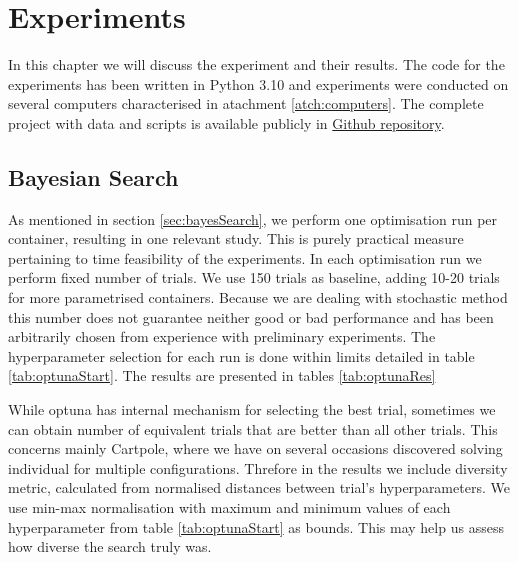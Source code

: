 \chapter{Experiments}
\label{ch:experiments}
In this chapter we will discuss the experiment and their results. The code for the experiments has been written in Python 3.10 and experiments were conducted on several computers characterised in atachment \ref{atch:computers}. The complete project with data and scripts is available publicly in \href{https://github.com/Schkliba/MastersThesis}{Github repository}.

\section{Bayesian Search}
As mentioned in section \ref{sec:bayesSearch}, we perform one optimisation run per container, resulting in one relevant study. This is purely practical measure pertaining to time feasibility of the experiments. In each optimisation run we perform fixed number of trials. We use 150 trials as baseline, adding 10-20 trials for more parametrised containers. Because we are dealing with stochastic method this number does not guarantee neither good or bad performance and has been arbitrarily chosen from experience with preliminary experiments.
The hyperparameter selection for each run is done within limits detailed in table \ref{tab:optunaStart}. The results are presented in tables \ref{tab:optunaRes}

While optuna has internal mechanism for selecting the best trial, sometimes we can obtain number of equivalent trials that are better than all other trials. This concerns mainly Cartpole, where we have on several occasions discovered solving individual for multiple configurations. Threfore in the results we include diversity metric, calculated from normalised distances between trial's hyperparameters. We use min-max normalisation with maximum and minimum values of each hyperparameter from table \ref{tab:optunaStart} as bounds. This may help us assess how diverse the search truly was.

